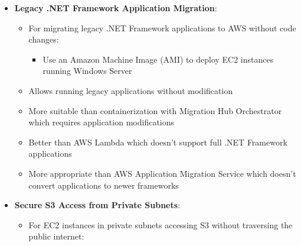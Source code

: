 \documentclass[11pt,a4paper]{report}
\begin{document}
\begin{itemize}
\begin{itemize}
  \item For applications with increasing compute and storage costs:
\begin{itemize}
  \item Purchase a Compute Savings Plan for the minimum number of necessary EC2 instances
  \item Use On-Demand Instances for peak scaling
  \item Set up S3 Lifecycle policies to archive raw images to lower-cost storage tiers after 30 days
\end{itemize}
  \item This approach balances cost savings with application performance
  \item More cost-effective than purchasing Savings Plans for maximum instance count
  \item Better than using Amazon EFS for storing large amounts of raw image data
  \item More suitable than reducing instance counts which could impact application performance
\end{itemize}
  \item \textbf{Legacy .NET Framework Application Migration}:
\begin{itemize}
  \item For migrating legacy .NET Framework applications to AWS without code changes:
\begin{itemize}
  \item Use an Amazon Machine Image (AMI) to deploy EC2 instances running Windows Server
\end{itemize}
  \item Allows running legacy applications without modification
  \item More suitable than containerization with Migration Hub Orchestrator which requires application modifications
  \item Better than AWS Lambda which doesn't support full .NET Framework applications
  \item More appropriate than AWS Application Migration Service which doesn't convert applications to newer frameworks
\end{itemize}
  \item \textbf{Secure S3 Access from Private Subnets}:
\begin{itemize}
  \item For EC2 instances in private subnets accessing S3 without traversing the public internet:
\begin{itemize}

\end{itemize}
\end{itemize}
\end{itemize}
\end{document}
